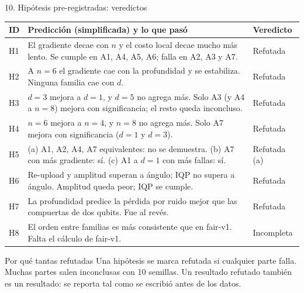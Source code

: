 \documentclass[aspectratio=169,10pt]{beamer}
\begin{document}
\begin{frame}{10. Hipótesis pre-registradas: veredictos}
\scriptsize
\begin{tabularx}{\textwidth}{@{}lXl@{}}
\toprule
\textbf{ID} & \textbf{Predicción (simplificada) y lo que pasó} & \textbf{Veredicto}\\
\midrule
H1 & El gradiente decae con $n$ y el costo local decae mucho más lento. Se cumple en A1, A4, A5, A6; falla en A2, A3 y A7. & Refutada\\
H2 & A $n=6$ el gradiente cae con la profundidad y se estabiliza. Ninguna familia cae con $d$. & Refutada\\
H3 & $d=3$ mejora a $d=1$, y $d=5$ no agrega más. Solo A3 (y A4 a $n=8$) mejora con significancia; el resto queda inconcluso. & Refutada\\
H4 & $n=6$ mejora a $n=4$, y $n=8$ no agrega más. Solo A7 mejora con significancia ($d=1$ y $d=3$). & Refutada\\
H5 & (a) A1, A2, A4, A7 equivalentes: no se demuestra. (b) A7 con más gradiente: sí. (c) A1 a $d=1$ con más fallas: sí. & Refutada (a)\\
H6 & Re-upload y amplitud superan a ángulo; IQP no supera a ángulo. Amplitud queda peor; IQP se cumple. & Refutada\\
H7 & La profundidad predice la pérdida por ruido mejor que las compuertas de dos qubits. Fue al revés. & Refutada\\
H8 & El orden entre familias es más consistente que en fair-v1. Falta el cálculo de fair-v1. & Incompleta\\
\bottomrule
\end{tabularx}
\vspace{0.3em}
\begin{azulbox}{Por qué tantas refutadas}
Una hipótesis se marca refutada si cualquier parte falla. Muchas partes salen inconclusas con 10 semillas. Un resultado refutado también es un resultado: se reporta tal como se escribió antes de los datos.
\end{azulbox}
\end{frame}
\end{document}
